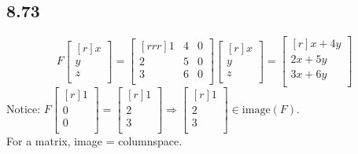\documentclass{report}
\theoremstyle{plain}
\theoremstyle{definition}
\theoremstyle{plain}
\begin{document}
\subsection{8.73}
\[ F\begin{bmatrix}[r]x\\y\\z\\\end{bmatrix} = \begin{bmatrix}[rrr]1&4&0\\2&5&0\\3&6&0\\\end{bmatrix}\begin{bmatrix}[r]x\\y\\z\\\end{bmatrix} = \begin{bmatrix}[r]x+4y\\2x+5y\\3x+6y\\\end{bmatrix} \]
Notice: $F\begin{bmatrix}[r]1\\0\\0\\\end{bmatrix}=\begin{bmatrix}[r]1\\2\\3\\\end{bmatrix} \Rightarrow \begin{bmatrix}[r]1\\2\\3\\\end{bmatrix} \in \mathrm{image}(F)$.\\
For a matrix, image = columnspace.
\end{document}
